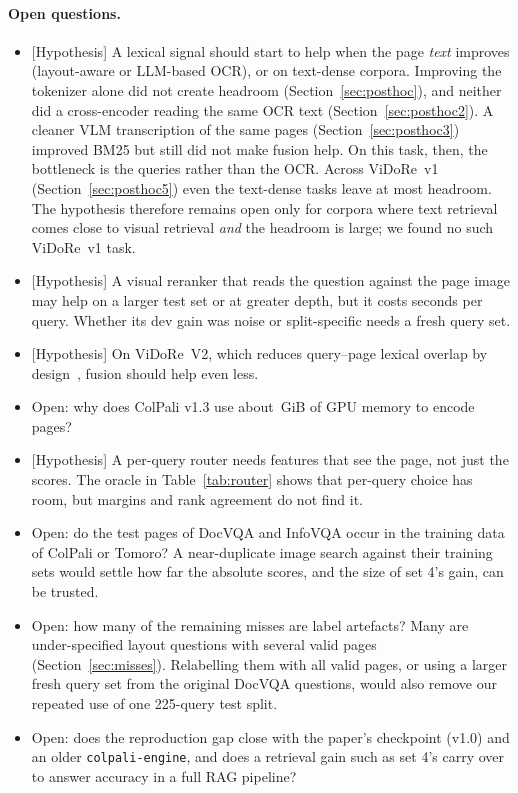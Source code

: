 \documentclass[11pt,a4paper]{article}
\newcommand{\lbl}[2]{\textsf{\scriptsize\textcolor{#1}{[#2]}}}
\newcommand{\Hyp}{\lbl{tagH}{Hypothesis}}
\begin{document}
\paragraph{Open questions.}
\begin{itemize}
  \item \Hyp{} A lexical signal should start to help when the page \emph{text} improves (layout-aware or LLM-based OCR), or on text-dense corpora. Improving the tokenizer alone did not create headroom (Section~\ref{sec:posthoc}), and neither did a cross-encoder reading the same OCR text (Section~\ref{sec:posthoc2}). A cleaner VLM transcription of the same pages (Section~\ref{sec:posthoc3}) improved BM25 but still did not make fusion help. On this task, then, the bottleneck is the queries rather than the OCR. Across ViDoRe~v1 (Section~\ref{sec:posthoc5}) even the text-dense tasks leave at most \pfMaxHead{} headroom. The hypothesis therefore remains open only for corpora where text retrieval comes close to visual retrieval \emph{and} the headroom is large; we found no such ViDoRe~v1 task.
  \item \Hyp{} A visual reranker that reads the question against the page image may help on a larger test set or at greater depth, but it costs seconds per query. Whether its dev gain was noise or split-specific needs a fresh query set.
  \item \Hyp{} On ViDoRe~V2, which reduces query--page lexical overlap by design~\cite{vidorev2}, fusion should help even less.
  \item Open: why does ColPali v1.3 use about \peakGPU{}\,GiB of GPU memory to encode pages?
  \item \Hyp{} A per-query router needs features that see the page, not just the scores. The oracle in Table~\ref{tab:router} shows that per-query choice has room, but margins and rank agreement do not find it.
  \item Open: do the test pages of DocVQA and InfoVQA occur in the training data of ColPali or Tomoro? A near-duplicate image search against their training sets would settle how far the absolute scores, and the size of set 4's gain, can be trusted.
  \item Open: how many of the remaining misses are label artefacts? Many are under-specified layout questions with several valid pages (Section~\ref{sec:misses}). Relabelling them with all valid pages, or using a larger fresh query set from the original DocVQA questions, would also remove our repeated use of one 225-query test split.
  \item Open: does the reproduction gap close with the paper's checkpoint (v1.0) and an older \texttt{colpali-engine}, and does a retrieval gain such as set 4's carry over to answer accuracy in a full RAG pipeline?
\end{itemize}
\end{document}

